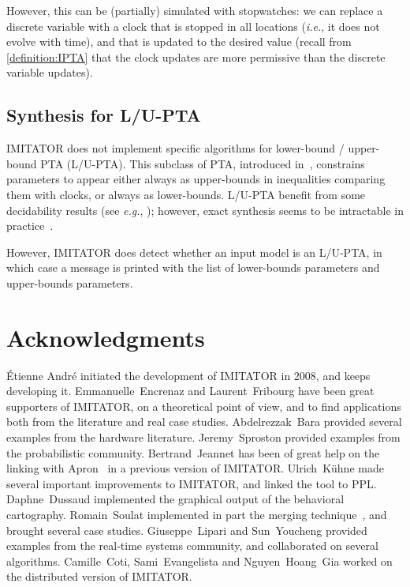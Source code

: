 \documentclass[a4paper,11pt]{report}
\makeatletter
\newcommand{\imitator}{\textsf{IMITATOR}}
\newcommand{\eg}{\textcolor{colorok}{\textit{e.g.},\@}}
\newcommand{\ie}{\textcolor{colorok}{\textit{i.e.},\@}}
\makeatother
\begin{document}
However, this can be (partially) simulated with stopwatches: we can replace a discrete variable with a clock that is stopped in all locations (\ie{} it does not evolve with time), and that is updated to the desired value (recall from \cref{definition:IPTA} that the clock updates are more permissive than the discrete variable updates).




\section{Synthesis for L/U-PTA}

\imitator{} does not implement specific algorithms for lower-bound / upper-bound PTA (L/U-PTA).
This subclass of PTA, introduced in~\cite{HRSV02}, constrains parameters to appear either always as upper-bounds in inequalities comparing them with clocks, or always as lower-bounds.
L/U-PTA benefit from some decidability results (see \eg{} \cite{HRSV02,BlT09,JLR15,AM15}); however, exact synthesis seems to be intractable in practice~\cite{JLR15}.

However, \imitator{} does detect whether an input model is an L/U-PTA, in which case a message is printed with the list of lower-bounds parameters and upper-bounds parameters.



\chapter{Acknowledgments}

\sloppy
\'Etienne André initiated the development of \imitator{} in 2008, and keeps developing it.
Emmanuelle~Encrenaz and Laurent~Fribourg have been great supporters of \imitator{}, on a theoretical point of view, and to find applications both from the literature and real case studies.
Abdelrezzak~Bara provided several examples from the hardware literature.
Jeremy~Sproston provided examples from the probabilistic community.
Bertrand~Jeannet has been of great help on the linking with Apron~\cite{JM09} in a previous version of \imitator{}.
Ulrich~K\"uhne made several important improvements to \imitator{}, and linked the tool to PPL.
Daphne~Dussaud implemented the graphical output of the behavioral cartography.
Romain~Soulat implemented in part the merging technique~\cite{AFS13atva}, and brought several case studies.
Giuseppe~Lipari and Sun~Youcheng provided examples from the real-time systems community, and collaborated on several algorithms.
Camille~Coti, Sami~Evangelista and Nguyen~Hoang~Gia worked on the distributed version of \imitator{}.
\end{document}
